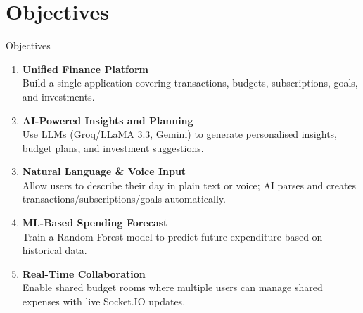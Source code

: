 \documentclass[aspectratio=169, 11pt]{beamer}
\begin{document}
\section{Objectives}
\begin{frame}{Objectives}
  \begin{enumerate}
    \item[\textcolor{auraviolet}{\textbf{O1}}] \textbf{Unified Finance Platform} \\
          Build a single application covering transactions, budgets, subscriptions, goals, and investments.

    \vspace{6pt}
    \item[\textcolor{auraviolet}{\textbf{O2}}] \textbf{AI-Powered Insights and Planning} \\
          Use LLMs (Groq/LLaMA 3.3, Gemini) to generate personalised insights, budget plans, and investment suggestions.

    \vspace{6pt}
    \item[\textcolor{auraviolet}{\textbf{O3}}] \textbf{Natural Language \& Voice Input} \\
          Allow users to describe their day in plain text or voice; AI parses and creates transactions/subscriptions/goals automatically.

    \vspace{6pt}
    \item[\textcolor{auraviolet}{\textbf{O4}}] \textbf{ML-Based Spending Forecast} \\
          Train a Random Forest model to predict future expenditure based on historical data.

    \vspace{6pt}
    \item[\textcolor{auraviolet}{\textbf{O5}}] \textbf{Real-Time Collaboration} \\
          Enable shared budget rooms where multiple users can manage shared expenses with live Socket.IO updates.
  \end{enumerate}
\end{frame}

\end{document}
